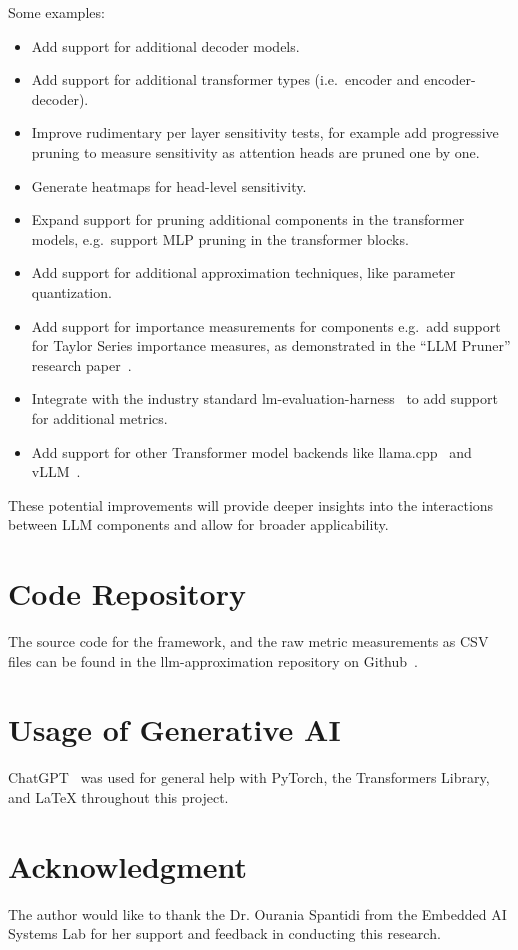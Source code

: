\documentclass[conference]{IEEEtran}
\begin{document}
    Some examples:

    \begin{itemize}
        \item Add support for additional decoder models.
        \item Add support for additional transformer types (i.e.\ encoder and encoder-decoder).
        \item Improve rudimentary per layer sensitivity tests, for example add progressive pruning to measure sensitivity as attention heads are pruned one by one.
        \item Generate heatmaps for head-level sensitivity.
        \item Expand support for pruning additional components in the transformer models, e.g.\ support MLP pruning in the transformer blocks.
        \item Add support for additional approximation techniques, like parameter quantization.
        \item Add support for importance measurements for components e.g.\ add support for Taylor Series importance measures, as demonstrated in the ``LLM Pruner'' research paper~\cite{ma2023llm}.
        \item Integrate with the industry standard lm-evaluation-harness~\cite{eval-harness} to add support for additional metrics.
        \item Add support for other Transformer model backends like llama.cpp~\cite{gerganov_llama_cpp} and vLLM~\cite{kwon2023efficient}.
    \end{itemize}

   These potential improvements will provide deeper insights into the interactions between LLM components and allow for broader applicability.

    \section*{Code Repository}

    The source code for the framework, and the raw metric measurements as CSV files can be found in the llm-approximation repository on Github~\cite{llm_approximation}.

    \section*{Usage of Generative AI}
    ChatGPT~\cite{chatgpt_2024} was used for general help with PyTorch, the Transformers Library, and LaTeX throughout this project.

    \section*{Acknowledgment}
    The author would like to thank the Dr. Ourania Spantidi from the Embedded AI Systems Lab for her support and feedback in conducting this research.

    
    
\end{document}
